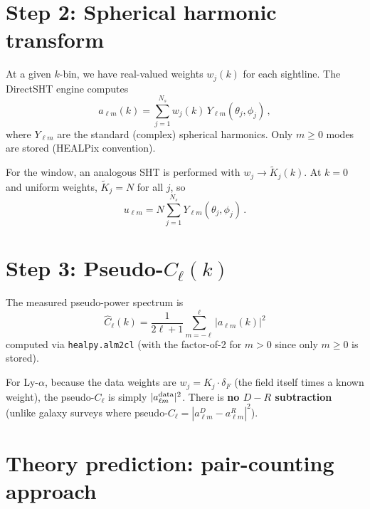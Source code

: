 \documentclass[11pt,a4paper]{article}
\newcommand{\Cl}{\hat{C}_\ell}
\begin{document}
\section{Step 2: Spherical harmonic transform}

At a given $k$-bin, we have real-valued weights $w_j(k)$ for each sightline.
The DirectSHT engine computes
\begin{equation}
  a_{\ell m}(k) = \sum_{j=1}^{N_s} w_j(k)\, Y_{\ell m}(\theta_j, \phi_j)\,,
  \label{eq:alm}
\end{equation}
where $Y_{\ell m}$ are the standard (complex) spherical harmonics.
Only $m \ge 0$ modes are stored (HEALPix convention).

For the window, an analogous SHT is performed with $w_j \to \tilde{K}_j(k)$.
At $k{=}0$ and uniform weights, $\tilde{K}_j = N$ for all $j$, so
\begin{equation}
  u_{\ell m} = N \sum_{j=1}^{N_s} Y_{\ell m}(\theta_j, \phi_j)\,.
\end{equation}


\section{Step 3: Pseudo-$C_\ell(k)$}

The measured pseudo-power spectrum is
\begin{equation}
  \boxed{
  \Cl(k) = \frac{1}{2\ell+1}
  \sum_{m=-\ell}^{\ell} \lvert a_{\ell m}(k) \rvert^2
  }
  \label{eq:pseudo_cl}
\end{equation}
computed via {\tt healpy.alm2cl} (with the factor-of-2 for $m>0$ since
only $m\ge0$ is stored).

For Ly-$\alpha$, because the data weights are $w_j = K_j \cdot \delta_F$
(the field itself times a known weight), the pseudo-$C_\ell$ is simply
$|a_{\ell m}^{\rm data}|^2$.
There is \textbf{no $D{-}R$ subtraction} (unlike galaxy surveys where
pseudo-$C_\ell = |a_{\ell m}^D - a_{\ell m}^R|^2$).


\section{Theory prediction: pair-counting approach}
\label{sec:pair}
\end{document}
